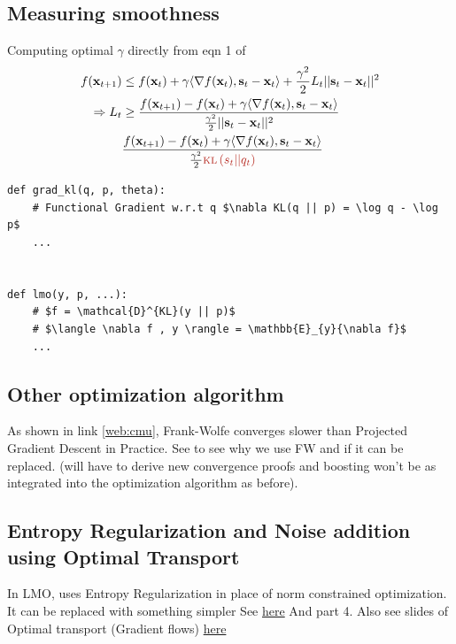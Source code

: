 \documentclass[summaries.tex]{subfiles}
\begin{document}
\subsection{Measuring smoothness}
\INPROGRESS
Computing optimal $\gamma$ directly
from eqn 1 of \cite{pedregosa2018step}
\begin{align*}
  f(\bx_{t+1}) &\leq f(\bx_t) + \gamma \langle \grad f(\bx_t), \bs_t - \bx_t \rangle 
  + \frac{\gamma^2}{2}L_t ||\bs_t - \bx_t||^2 \\
  \Rightarrow L_t &\geq \frac{f(\bx_{t+1}) - f(\bx_t) 
  + \gamma \langle \grad f(\bx_t), \bs_t - \bx_t \rangle}
  {\frac{\gamma^2}{2}||\bs_t - \bx_t||^2}  \\
                  &\frac{f(\bx_{t+1}) - f(\bx_t) 
                  + \gamma \langle \grad f(\bx_t), \bs_t - \bx_t \rangle}
                  {\frac{\gamma^2}{2} \red{\kl{s_t || q_t}}}  \\
\end{align*}
\begin{verbatim}
def grad_kl(q, p, theta):
    # Functional Gradient w.r.t q $\nabla KL(q || p) = \log q - \log p$
    ...


def lmo(y, p, ...):
    # $f = \mathcal{D}^{KL}(y || p)$
    # $\langle \nabla f , y \rangle = \mathbb{E}_{y}{\nabla f}$
    ...
\end{verbatim}

\subsection{Other optimization algorithm}
\TODO
As shown in link \ref{web:cmu}, Frank-Wolfe converges slower than Projected 
Gradient Descent in Practice. See \cite{locatello2017boosting} to see why we use
FW and if it can be replaced. (will have to derive new convergence proofs and
boosting won't be as integrated into the optimization algorithm as before).

\subsection{Entropy Regularization and Noise addition using Optimal Transport}
In LMO, \cite{locatello2018boosting} uses Entropy Regularization in place of
norm constrained optimization. It can be replaced with something simpler 
See \cite{tolstikhin2017wasserstein} \cite{liu2018entropy} \cite{bernton2017inference}
\cite{jordan1998variational} \href{https://www-dimat.unipv.it/savare/Ravello2010/JKO.pdf}
{here} And \cite{peyre2017computational} part 4.
Also see slides of Optimal transport (Gradient flows) \href{https://optimaltransport.github.io}
{here} 
\end{document}
